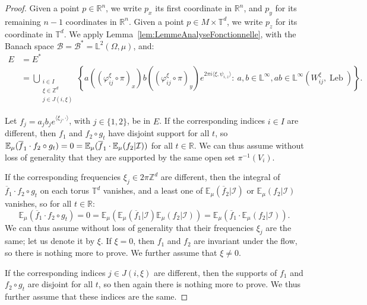 \documentclass[AHL,Unicode,longabstracts]{cedram}
\DeclareMathOperator{\Leb}{Leb}
\newcommand{\Z}{\mathbb{Z}}
\newcommand{\R}{\mathbb{R}}
\newcommand{\Ebb}{\mathbb{E}}
\newcommand{\Lbb}{\mathbb{L}}
\newcommand{\Tbb}{\mathbb{T}}
\newcommand{\Bcal}{\mathcal{B}}
\newcommand{\Ical}{\mathcal{I}}
\begin{document}
\begin{proof}
Given a point $p \in \R^n$, we write $p_x$ its first coordinate in $\R^n$, and $p_y$ for its remaining $n-1$ coordinates in $\R^n$. Given a point $p \in M \times \Tbb^d$, we write $p_z$ for its coordinate in $\Tbb^d$. We apply Lemma~\ref{lem:LemmeAnalyseFonctionnelle}, with the Banach space $\Bcal = \Bcal^* = \Lbb^2 (\Omega, \mu)$, and:
\begin{align*}
E & = E^* \\
& = \bigcup_{\substack{i \in I \\ \xi \in \Z^d \\ j \in J (i,\xi)}} \left\{a \left((\varphi_{ij}^\xi \circ \pi)_x\right) b \left((\varphi_{ij}^\xi \circ \pi)_y\right) e^{2\pi i \langle \xi, \psi_{i,z} \rangle} :\!\ a, b \in \Lbb^\infty, ab \in \Lbb^\infty \left(W_{ij}^\xi, \Leb\right) \right\}.
\end{align*}


Let $f_j = a_j b_j e^{\langle \xi_j, \cdot \rangle}$, with $j \in \{1,2\}$, be in $E$. If the corresponding indices $i \in I$ are different, then $f_1$ and $f_2 \circ g_t$ have disjoint support for all $t$, so $\Ebb_\mu (\overline{f}_1 \cdot f_2 \circ g_t) = 0\linebreak= \Ebb_\mu (\overline{f}_1 \cdot \Ebb_\mu (f_2 | \Ical))$ for all $t \in \R$. We can thus assume without loss of generality that they are supported by the same open set $\pi^{-1} (V_i)$.


If the corresponding frequencies $\xi_j \in 2\pi\Z^d$ are different, then the integral of $\overline{f}_1 \cdot f_2 \circ g_t$ on each torus $\Tbb^d$ vanishes, and a least one of $\Ebb_\mu (\overline{f}_2 | \Ical)$ or $\Ebb_\mu (f_2 | \Ical)$ vanishes, so for all $t \in \R$:
\[
\Ebb_\mu \left(\overline{f}_1 \cdot f_2 \circ g_t\right) = 0 = \Ebb_\mu \left(\Ebb_\mu (\overline{f}_1 | \Ical) \Ebb_\mu (f_2 | \Ical)\right) = \Ebb_\mu \left(\overline{f}_1 \cdot \Ebb_\mu (f_2 | \Ical)\right).
\]
We can thus assume without loss of generality that their frequencies $\xi_j$ are the same; let us denote it by $\xi$. If $\xi = 0$, then $f_1$ and $f_2$ are invariant under the flow, so there is nothing more to prove. We further assume that $\xi \neq 0$.


If the corresponding indices $j \in J(i, \xi)$ are different, then the supports of $f_1$ and $f_2 \circ g_t$ are disjoint for all $t$, so then again there is nothing more to prove. We thus further assume that these indices are the same.


\end{proof}
\end{document}

